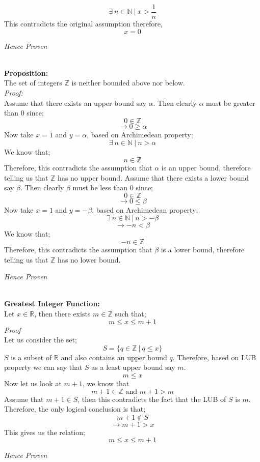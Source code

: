 \documentclass[english,course]{lecture}
\begin{document}
$$ \exists \ n \in \mathbb{N} \ | \ x > \frac{1}{n}$$
This contradicts the original assumption therefore, 
$$ x = 0$$
\begin{center}
\emph{Hence Proven}
\end{center}
\\
\textbf{Proposition:} \\
The set of integers $\mathbb{Z}$ is neither bounded above nor below. \\
\textit{Proof:} \\
Assume that there exists an upper bound say $\alpha$. Then clearly $\alpha$ must be greater than 0 since;
$$ 0 \in \mathbb{Z} $$
$$ \rightarrow 0 \geq \alpha$$
Now take $x=1$ and $y=\alpha$, based on Archimedean property;
$$ \exists \ n \in \mathbb{N} \ | \ n > \alpha $$
We know that;
$$ n \in \mathbb{Z} $$
Therefore, this contradicts the assumption that $\alpha$ is an upper bound, therefore telling us that $\mathbb{Z}$ has no upper bound.
Assume that there exists a lower bound say $\beta$. Then clearly $\beta$ must be less than 0 since;
$$ 0 \in \mathbb{Z} $$
$$ \rightarrow 0 \leq \beta$$
Now take $x=1$ and $y=-\beta$, based on Archimedean property;
$$ \exists \ n \in \mathbb{N} \ | \ n > -\beta $$
$$ \rightarrow -n < \beta $$
We know that;
$$ -n \in \mathbb{Z} $$
Therefore, this contradicts the assumption that $\beta$ is a lower bound, therefore telling us that $\mathbb{Z}$ has no lower bound.
\begin{center}
\emph{Hence Proven}
\end{center}
\\ 
\textbf{Greatest Integer Function:} \\
Let $x \in \mathbb{R}$, then there exists $m \in \mathbb{Z}$ such that; 
$$ m \leq x \leq m+1 $$
\textit{Proof} \\
Let us consider the set;
$$ S = \lbrace q \in \mathbb{Z} \ | \ q \leq x \rbrace $$
$S$ is a subset of $\mathbb{R}$ and also contains an upper bound $q$. Therefore, based on LUB property we can say that $S$ as a least upper bound say $m$. 
$$ m \leq x $$
Now let us look at $m+1$, we know that
$$ m+1 \in \mathbb{Z} \text{ and } m+1 > m$$
Assume that $m+1 \in S$, then this contradicts the fact that the LUB of $S$ is $m$. Therefore, the only logical conclusion is that;
$$ m+1 \notin S $$
$$ \rightarrow m+1 > x $$
This gives us the relation;
$$ m \leq x \leq m+1$$
\begin{center}
\emph{Hence Proven}
\end{center}
\end{document}

